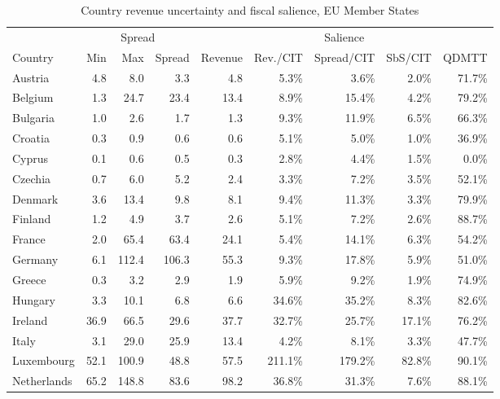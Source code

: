 \begin{table}[H]
\centering
\scriptsize
\setlength{\tabcolsep}{2pt}
\caption[Country revenue uncertainty and fiscal salience]{Country revenue uncertainty and fiscal salience, EU Member States}
\label{tab:country_revenue_diagnostic}
\label{tab:country_spread_updated}
\label{tab:country_fiscal_salience}
\begin{adjustbox}{max width=\textwidth,center}
\begin{tabular}{@{}l rrr r rrrr@{}}
\toprule
 & \multicolumn{3}{c}{Spread} & \multicolumn{5}{c}{Salience} \\
\cmidrule(lr){2-4} \cmidrule(lr){5-9}
Country & Min & Max & Spread & Revenue & Rev./CIT & Spread/CIT & SbS/CIT & QDMTT \\
\midrule
Austria & 4.8 & 8.0 & 3.3 & 4.8 & 5.3\% & 3.6\% & 2.0\% & 71.7\% \\
Belgium & 1.3 & 24.7 & 23.4 & 13.4 & 8.9\% & 15.4\% & 4.2\% & 79.2\% \\
Bulgaria & 1.0 & 2.6 & 1.7 & 1.3 & 9.3\% & 11.9\% & 6.5\% & 66.3\% \\
Croatia & 0.3 & 0.9 & 0.6 & 0.6 & 5.1\% & 5.0\% & 1.0\% & 36.9\% \\
Cyprus & 0.1 & 0.6 & 0.5 & 0.3 & 2.8\% & 4.4\% & 1.5\% & 0.0\% \\
Czechia & 0.7 & 6.0 & 5.2 & 2.4 & 3.3\% & 7.2\% & 3.5\% & 52.1\% \\
Denmark & 3.6 & 13.4 & 9.8 & 8.1 & 9.4\% & 11.3\% & 3.3\% & 79.9\% \\
Finland & 1.2 & 4.9 & 3.7 & 2.6 & 5.1\% & 7.2\% & 2.6\% & 88.7\% \\
France & 2.0 & 65.4 & 63.4 & 24.1 & 5.4\% & 14.1\% & 6.3\% & 54.2\% \\
Germany & 6.1 & 112.4 & 106.3 & 55.3 & 9.3\% & 17.8\% & 5.9\% & 51.0\% \\
Greece & 0.3 & 3.2 & 2.9 & 1.9 & 5.9\% & 9.2\% & 1.9\% & 74.9\% \\
Hungary & 3.3 & 10.1 & 6.8 & 6.6 & 34.6\% & 35.2\% & 8.3\% & 82.6\% \\
Ireland & 36.9 & 66.5 & 29.6 & 37.7 & 32.7\% & 25.7\% & 17.1\% & 76.2\% \\
Italy & 3.1 & 29.0 & 25.9 & 13.4 & 4.2\% & 8.1\% & 3.3\% & 47.7\% \\
Luxembourg & 52.1 & 100.9 & 48.8 & 57.5 & 211.1\% & 179.2\% & 82.8\% & 90.1\% \\
Netherlands & 65.2 & 148.8 & 83.6 & 98.2 & 36.8\% & 31.3\% & 7.6\% & 88.1\% \\

\end{tabular}
\end{adjustbox}
\end{table}
